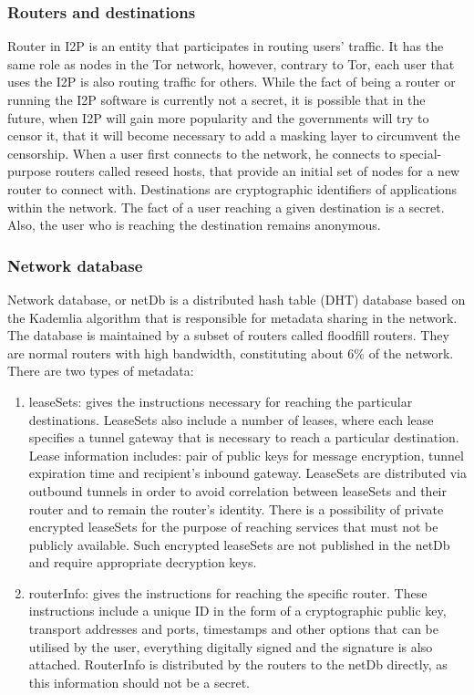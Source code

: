 \subsubsection{Routers and destinations}
Router in I2P is an entity that participates in routing users’ traffic. It has the same role as nodes in the Tor network, however, contrary to Tor, each user that uses the I2P is also routing traffic for others. While the fact of being a router or running the I2P software is currently not a secret, it is possible that in the future, when I2P will gain more popularity and the governments will try to censor it, that it will become necessary to add a masking layer to circumvent the censorship. When a user first connects to the network, he connects to special-purpose routers called reseed hosts, that provide an initial set of nodes for a new router to connect with.
Destinations are cryptographic identifiers of applications within the network. The fact of a user reaching a given destination is a secret. Also, the user who is reaching the destination remains anonymous.

\subsubsection{Network database}
Network database, or netDb is a distributed hash table (DHT) database based on the Kademlia algorithm that is responsible for metadata sharing in the network. The database is maintained by a subset of routers called floodfill routers. They are normal routers with high bandwidth, constituting about 6\% of the network. There are two types of metadata:
\begin{enumerate}
    \item leaseSets: gives the instructions necessary for reaching the particular destinations. LeaseSets also include a number of leases, where each lease specifies a tunnel gateway that is necessary to reach a particular destination. Lease information includes: pair of public keys for message encryption, tunnel expiration time and recipient’s inbound gateway. LeaseSets are distributed via outbound tunnels in order to avoid correlation between leaseSets and their router and to remain the router’s identity.
    There is a possibility of private encrypted leaseSets for the purpose of reaching services that must not be publicly available. Such encrypted leaseSets are not published in the netDb and require appropriate decryption keys.
    \item routerInfo: gives the instructions for reaching the specific router. These instructions include a unique ID in the form of a cryptographic public key,  transport addresses and ports, timestamps and other options that can be utilised by the user, everything digitally signed and the signature is also attached. RouterInfo is distributed by the routers to the netDb directly, as this information should not be a secret.
\end{enumerate}

